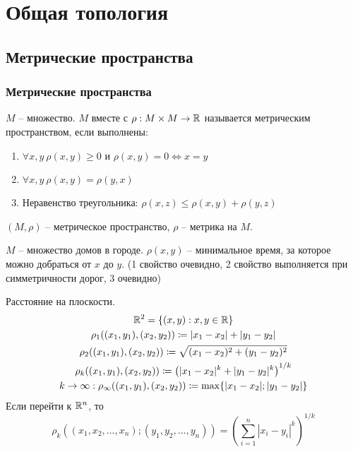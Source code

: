 \documentclass[main]{subfiles}
\begin{document}
\part*{Общая топология}
\chapter{Метрические пространства}
\section{Метрические пространства}
\begin{definition}
    $M$ -- множество. $M$ вместе с $\rho: M \times M \to \mathbb{R}$ называется
    метрическим пространством, если выполнены:
    \begin{enumerate}
        \item $\forall x,y \ \rho(x,y) \ge 0$ и $\rho(x,y) = 0 \Leftrightarrow x=y$
        \item $\forall x,y \ \rho(x,y) = \rho(y,x)$
        \item Неравенство треугольника: $\rho(x,z) \le \rho(x,y) + \rho(y,z)$
    \end{enumerate}
    $(M, \rho)$ -- метрическое пространство, $\rho$ -- метрика на $M$.
\end{definition}
\begin{example}
    $M$ -- множество домов в городе. $\rho(x,y)$ -- минимальное время,
    за которое можно добраться от $x$ до $y$.
    (1 свойство очевидно, 2 свойство выполняется при симметричности дорог, 3 очевидно)
\end{example}
\begin{example}
    Расстояние на плоскости.
    \begin{gather*}
        \mathbb{R}^2 = \{(x,y):x,y \in \mathbb{R}\}\\
        \rho_1((x_1, y_1), (x_2, y_2)) \coloneqq |x_1 - x_2| + |y_1 - y_2|\\
        \rho_2((x_1, y_1), (x_2, y_2)) \coloneqq \sqrt{(x_1 - x_2)^2 + (y_1 - y_2)^2}\\
        \rho_k((x_1, y_1), (x_2, y_2)) \coloneqq \left(|x_1 - x_2|^k + |y_1 - y_2|^k\right)^{1/k}\\
        k \to \infty: \rho_\infty((x_1, y_1), (x_2, y_2)) \coloneqq \max\{|x_1 - x_2|; |y_1 - y_2|\}
    \end{gather*}
    Если перейти к $\mathbb{R}^n$, то
    \[\rho_k((x_1,x_2,..., x_n); (y_1, y_2,...,y_n)) = \left(\sum_{i=1}^n |x_i-y_i|^k\right)^{1/k}\]
\end{example}
\end{document}
